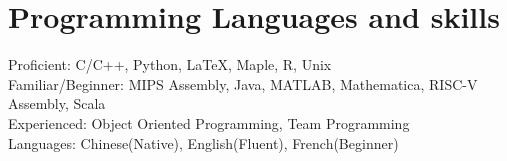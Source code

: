 \section{\sc Programming Languages and skills}
Proficient: C/C++, Python, \LaTeX, Maple, R, Unix\\
Familiar/Beginner: MIPS Assembly, Java, MATLAB, Mathematica, RISC-V Assembly, Scala\\
Experienced: Object Oriented Programming, Team Programming\\
Languages: Chinese(Native), English(Fluent), French(Beginner)
\endinput